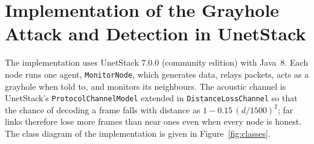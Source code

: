 \documentclass[conference]{IEEEtran}
\begin{document}
\section{Implementation of the Grayhole Attack and Detection in UnetStack}\label{sec:impl}
The implementation uses UnetStack 7.0.0 (community edition) with Java~8. Each node runs one agent, \texttt{MonitorNode}, which generates data, relays packets, acts as a grayhole when told to, and monitors its neighbours. The acoustic channel is UnetStack's \texttt{ProtocolChannelModel} extended in \texttt{DistanceLossChannel} so that the chance of decoding a frame falls with distance as $1-0.15\,(d/1500)^2$; far links therefore lose more frames than near ones even when every node is honest. The class diagram of the implementation is given in Figure~\ref{fig:classes}.
\end{document}
